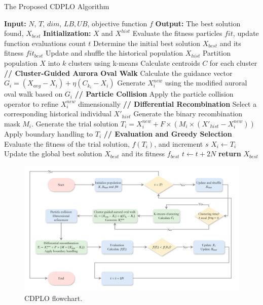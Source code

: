 \documentclass[review]{elsarticle}
\begin{document}
\begin{algorithm}[H]
\caption{The Proposed CDPLO Algorithm}
\label{algo: CDPLO}
\begin{algorithmic}[1]
\State \textbf{Input:} $N$, $T$, $dim$, $LB, UB$, objective function $f$
\State \textbf{Output:} The best solution found, $X_{best}$
\State \textbf{Initialization:} $X$ and $X^{hist}$
\State Evaluate the fitness particles $fit$, update function evaluations count $t$
\State Determine the initial best solution $X_{best}$ and its fitness $fit_{best}$
    \State Update and shuffle the historical population $X_{hist}$
        \State Partition population $X$ into $k$ clusters using k-means
        \State Calculate centroids $C$ for each cluster
    \EndIf
        \State \textbf{// Cluster-Guided Aurora Oval Walk}
        \State Calculate the guidance vector ${G}_i = ({X_{avg}} - X_i) + \eta(C_{k_i} - X_i)$
        \State Generate $X_i^{new}$ using the modified auroral oval walk based on ${G}_i$
        \State \textbf{// Particle Collision}
        \State Apply the particle collision operator to refine $X_i^{new}$ dimensionally
    \EndFor
        \State \textbf{// Differential Recombination}
        \State Select a corresponding historical individual $X'_{hist}$
        \State Generate the binary recombination mask $M_i$.
        \State Generate the trial solution $T_i = X_i^{new} + F \times (M_i \times (X'_{hist} - X_i^{new}))$
        \State Apply boundary handling to $T_i$
    \EndFor
        \State \textbf{// Evaluation and Greedy Selection}
        \State Evaluate the fitness of the trial solution, $f(T_i)$, and increment $s$
            \State $X_i \leftarrow T_i$
        \EndIf
    \EndFor
    \State Update the global best solution $X_{best}$ and its fitness $f_{best}$
    \State $t \leftarrow t + 2N$
\EndWhile
\State \textbf{return} $X_{best}$
\end{algorithmic}
\end{algorithm}

\begin{figure}
	\centering
	\includegraphics[width=1\textwidth]{CDPLO-flowchart.png}
	\caption{CDPLO flowchart.}
	\label{fig: CDPLO-flowchart}
\end{figure}
\end{document}
